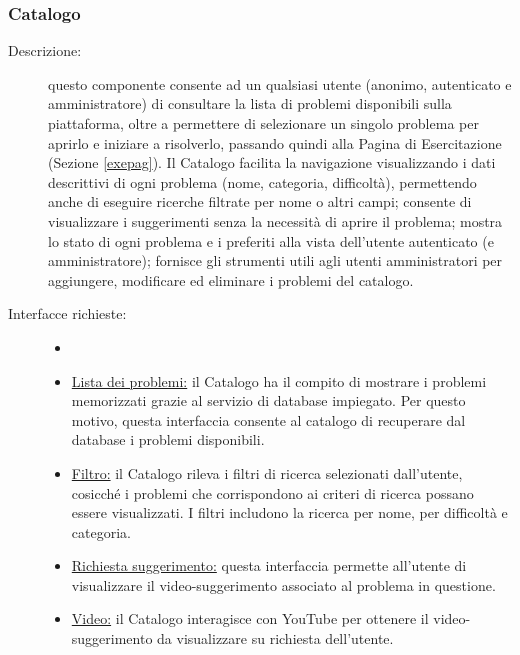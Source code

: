 \documentclass[11pt, a4paper]{article}
\theoremstyle{definition} %
\begin{document}
\subsubsection{Catalogo}
\begin{description}
    \item[Descrizione:] questo componente consente ad un qualsiasi utente
    (anonimo, autenticato e amministratore) di consultare la lista di problemi
    disponibili sulla piattaforma, oltre a permettere di selezionare un singolo
    problema per aprirlo e iniziare a risolverlo, passando quindi alla Pagina di
    Esercitazione (Sezione \ref{exepag}).
    Il Catalogo facilita la navigazione visualizzando i dati descrittivi di ogni
    problema (nome, categoria, difficoltà), permettendo anche di eseguire ricerche
    filtrate per nome o altri campi; consente di visualizzare i suggerimenti senza
    la necessità di aprire il problema; mostra lo stato di ogni problema e i
    preferiti alla vista dell'utente autenticato (e amministratore); fornisce gli
    strumenti utili agli utenti amministratori per aggiungere, modificare ed
    eliminare i problemi del catalogo.

    \item[Interfacce richieste:]
    \begin{itemize}
        \item[]

        \item \underline{Lista dei problemi:} il Catalogo ha il compito di
        mostrare i problemi memorizzati grazie al servizio di database impiegato.
        Per questo motivo, questa interfaccia consente al catalogo di recuperare
        dal database i problemi disponibili.

        \item \underline{Filtro:} il Catalogo rileva i filtri di ricerca selezionati
        dall'utente, cosicché i problemi che corrispondono ai criteri di ricerca possano
        essere visualizzati. I filtri includono la ricerca per nome, per difficoltà e categoria.

        \item \underline{Richiesta suggerimento:} questa interfaccia permette all'utente
        di visualizzare il video-suggerimento associato al problema in questione.

        \item \underline{Video:} il Catalogo interagisce con YouTube per ottenere il
        video-suggerimento da visualizzare su richiesta dell'utente.


\end{itemize}
\end{description}
\end{document}
